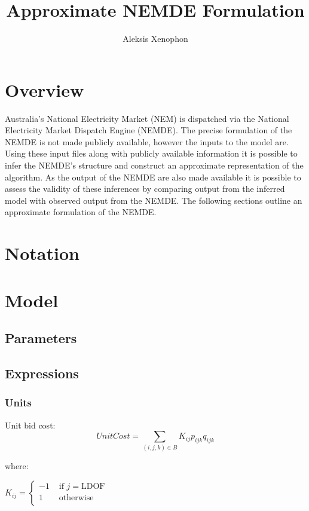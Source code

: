 \documentclass{article}
\title{Approximate NEMDE Formulation}
\author{Aleksis Xenophon}
\begin{document}
\maketitle

\section{Overview}
Australia's National Electricity Market (NEM) is dispatched via the National Electricity Market Dispatch Engine (NEMDE). The precise formulation of the NEMDE is not made publicly available, however the inputs to the model are. Using these input files along with publicly available information it is possible to infer the NEMDE's structure and construct an approximate representation of the algorithm. As the output of the NEMDE are also made available it is possible to assess the validity of these inferences by comparing output from the inferred model with observed output from the NEMDE. The following sections outline an approximate formulation of the NEMDE.

\section{Notation}

\section{Model}

\subsection{Parameters}

\subsection{Expressions}
\subsubsection{Units}
Unit bid cost:
\begin{equation}
	UnitCost = \sum\limits_{(i,j,k) \in B} K_{ij} p_{ijk} q_{ijk}
\end{equation}

where:

$K_{ij}=
\begin{cases}
	-1 &\textrm{ if $j=$LDOF} \\
	1 &\textrm{ otherwise} \\
\end{cases}$
\end{document}
